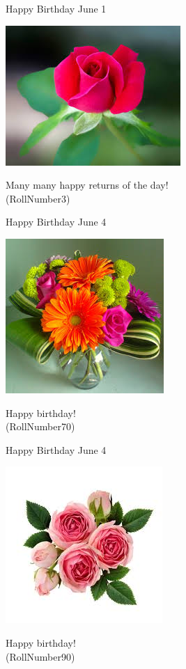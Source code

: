 \documentclass[table, landscape]{beamer}
\begin{document}
\begin{frame}{\color{blue}Happy Birthday }
{June 1}
\begin{center}
\includegraphics[height=0.5\textheight]{flowers/f3.jpeg}

Many many happy returns of the day! \\ \vspace{0.5cm}{\Large name3} (RollNumber3)
\end{center}
\end{frame}
\begin{frame}{\color{blue}Happy Birthday }
{June 4}
\begin{center}
\includegraphics[height=0.5\textheight]{flowers/f8.jpeg}

Happy birthday! \\ \vspace{0.5cm}{\Large name63} (RollNumber70)
\end{center}
\end{frame}
\begin{frame}{\color{red}Happy Birthday }
{June 4}
\begin{center}
\includegraphics[height=0.5\textheight]{flowers/f5.jpeg}

Happy birthday! \\ \vspace{0.5cm}{\Large name83} (RollNumber90)
\end{center}
\end{frame}
\end{document}
